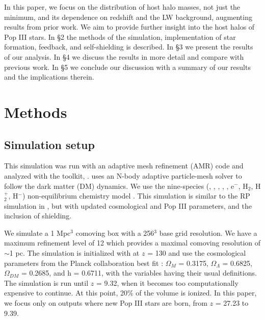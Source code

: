 \documentclass[a4paper,fleqn,usenatbib]{mnras}
\begin{document}
In this paper, we focus on the distribution of host halo masses, not just the minimum, and its dependence on redshift and the LW background, augmenting results from prior work. We aim to provide further insight into the host halos of Pop III stars. In \S 2 the methods of the simulation, implementation of star formation, feedback, and \hh{} self-shielding is described. In \S 3 we present the results of our analysis. In \S 4 we discuss the results in more detail and compare with previous work. In \S 5 we conclude our discussion with a summary of our results and the implications therein.

\section{Methods}
\subsection{Simulation setup}
This simulation was run with an adaptive mesh refinement (AMR) code 
\enzo{} \citep{Enzo} and analyzed with the toolkit, \yt{} \citep{yt_full_paper}. \enzo{} uses an N-body adaptive particle-mesh solver \citep{Efstathiou85, Couchman91, BryanNorman1997} to follow the dark matter (DM) dynamics. We use the nine-species (\hi, \hii, \hei, \heii, \heiii, e$^{-}$, H$_{2}$, H$_{2}^{+}$, H$^{-}$) non-equilibrium chemistry model \citep{Abel97, Anninos97}. This simulation is similar to the RP simulation in 
\citet[hereafter W12]{Wise12_RP}, but with updated cosmological and Pop III parameters, and the inclusion of \hh{} shielding.

We simulate a 1 Mpc$^{3}$ comoving box with a 256$^{3}$ base grid 
resolution. We have a maximum refinement level of 12 which provides a maximal comoving resolution of $\sim$1 pc. The simulation is 
initialized with \music{} \citep{Hahn11_MUSIC} at $z$ = 130 and use the cosmological parameters from the Planck collaboration best fit 
\citet{Planck13_Cosmo}: $\Omega_{M}$ = 0.3175, $\Omega_{\Lambda}$ = 
0.6825, $\Omega_{DM}$ = 0.2685, and h = 0.6711, with the variables 
having their usual definitions. The simulation is run until $z$ = 9.32, when it becomes too computationally expensive to continue. At this point, 20\% of the volume is ionized. In this paper, we focus only on outputs where new Pop III stars are born, from $z$ = 27.23 to 9.39. 
\end{document}

